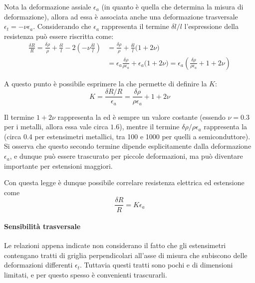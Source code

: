		Nota la deformazione assiale $\epsilon_a$ (in quanto è quella che determina la misura di deformazione), allora ad essa è associata anche una deformazione trasversale $\epsilon_t = - \nu \epsilon_a$. Considerando che $\epsilon_a$ rappresenta il termine $\delta l/l$ l'espressione della resistenza può essere riscritta come:
		\begin{align*}
			\frac{\delta R}{R} =  \frac{\delta \rho}{\rho} + \frac{\delta l}{l} - 2\left( -\nu \frac{\delta l}{l} \right) & = \frac{\delta \rho}{\rho} + \frac{\delta l}{l} \big(1+2\nu\big) \\ 
			& = \epsilon_a \frac{\delta \rho}{\rho \epsilon_a} + \epsilon_a \big(1+2\nu\big) = \epsilon_a \left( \frac{\delta \rho}{\rho \epsilon_a} +  1+2\nu\right)
		\end{align*}
		
		\begin{concetto}
			A questo punto è possibile esprimere la  che permette di definire la  $K$:
			\begin{equation} \label{eq:def:primalegge}
				K = \frac{\delta R / R}{\epsilon_a} = \frac{\delta \rho}{\rho \epsilon_a} + 1 + 2\nu
			\end{equation} 
		\end{concetto} 
	
		Il termine $1+2\nu$ rappresenta la  ed è sempre un valore costante (essendo $\nu = 0.3$ per i metalli, allora essa vale circa $1.6$), mentre il termine $\delta \rho / \rho \epsilon_a$ rappresenta la  (circa 0.4 per estensimetri metallici, tra 100 e 1000 per quelli a semiconduttore). Si osserva che questo secondo termine dipende esplicitamente dalla deformazione $\epsilon_a$, e dunque può essere trascurato per piccole deformazioni, ma può diventare importante per estensioni maggiori.
		
		Con questa legge è dunque possibile correlare resistenza elettrica ed estensione come
		\[ \frac {\delta R} R = K \epsilon_a  \]
		
		\paragraph{Sensibilità trasversale} Le relazioni appena indicate non considerano il fatto che gli estensimetri contengano tratti di griglia perpendicolari all'asse di misura che subiscono delle deformazioni differenti $\epsilon_t$. Tuttavia questi tratti sono pochi e di dimensioni limitati, e per questo spesso è convenienti trascurarli. 
		
